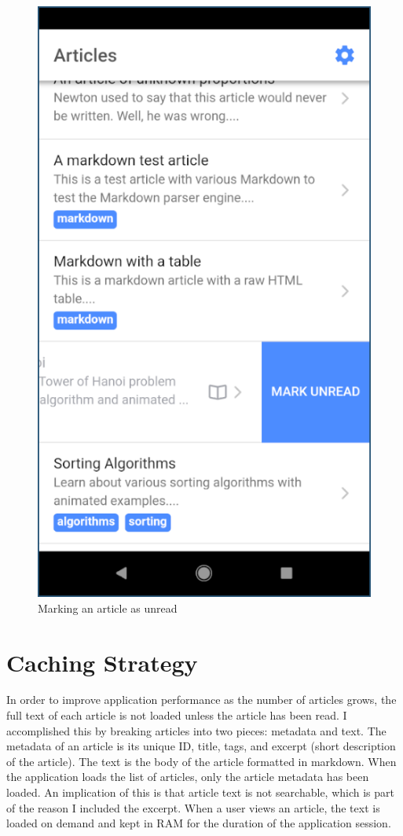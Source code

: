 \documentclass[12pt]{report}
\begin{document}
\begin{figure}
    \centering
    \includegraphics[scale=0.5]{images/avd-article-mark-unread.png}
    \caption{Marking an article as unread}
    \label{fig:avd-article-mark-unread}
\end{figure}

    \section{Caching Strategy}

In order to improve application performance as the number of articles grows, the
full text of each article is not loaded unless the article has been read. I
accomplished this by breaking articles into two pieces: metadata and text. The
metadata of an article is its unique ID, title, tags, and excerpt (short
description of the article). The text is the body of the article formatted in
markdown. When the application loads the list of articles, only the article
metadata has been loaded. An implication of this is that article text is not
searchable, which is part of the reason I included the excerpt. When a user
views an article, the text is loaded on demand and kept in RAM for the duration
of the application session.
\end{document}

